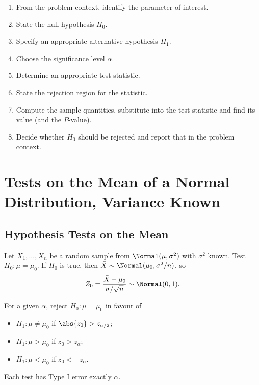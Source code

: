 \begin{definition}
\begin{enumerate}[label=\arabic*.]
  \item From the problem context, identify the parameter of interest.
  \item State the null hypothesis $H_0$.
  \item Specify an appropriate alternative hypothesis $H_1$.
  \item Choose the significance level $\alpha$.
  \item Determine an appropriate test statistic.
  \item State the rejection region for the statistic.
  \item Compute the sample quantities, substitute into the test statistic and find its value (and the $P$-value).
  \item Decide whether $H_0$ should be rejected and report that in the problem context.
\end{enumerate}
\end{definition}

\section{Tests on the Mean of a Normal Distribution, Variance Known}

\subsection{Hypothesis Tests on the Mean}

Let $X_1,\dots,X_n$ be a random sample from $\Normal(\mu,\sigma^2)$ with $\sigma^2$ known. Test $H_0:\mu=\mu_0$. If $H_0$ is true, then $\bar{X}\sim\Normal(\mu_0,\sigma^2/n)$, so
\[ Z_0=\frac{\bar{X}-\mu_0}{\sigma/\sqrt n}\sim\Normal(0,1). \]

\begin{theorem}[$z$-test]\label{thm:ztest}
For a given $\alpha$, reject $H_0:\mu=\mu_0$ in favour of
\begin{itemize}
  \item $H_1:\mu\ne\mu_0$ if $\abs{z_0}>z_{\alpha/2}$;
  \item $H_1:\mu>\mu_0$ if $z_0>z_\alpha$;
  \item $H_1:\mu<\mu_0$ if $z_0<-z_\alpha$.
\end{itemize}
Each test has Type I error exactly $\alpha$.
\end{theorem}

